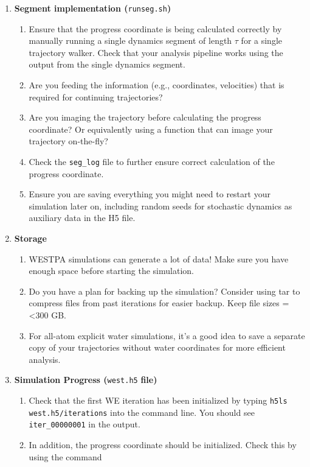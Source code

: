 \documentclass[9pt,tutorial,pubversion]{livecoms}
\begin{document}
\begin{enumerate}
\begin{enumerate}
\end{enumerate}
\item \textbf{Segment implementation (}\verb|runseg.sh|\textbf{)}
\begin{enumerate}
\item Ensure that the progress coordinate is being calculated correctly by manually running a single dynamics segment of length $\tau$ for a single trajectory walker. 
Check that your analysis pipeline works using the output from the single dynamics segment. 
\item Are you feeding the information (e.g., coordinates, velocities) that is required for continuing trajectories? 
\item Are you imaging the trajectory before calculating the progress coordinate?  Or equivalently using a function that can image your trajectory on-the-fly?
\item Check the \verb|seg_log| file to further ensure correct calculation of the progress coordinate. 
\item Ensure you are saving everything you might need to restart your simulation later on, including random seeds for stochastic dynamics as auxiliary data in the H5 file. 
\end{enumerate}
\item \textbf{Storage}
\begin{enumerate}
\item WESTPA simulations can generate a lot of data! Make sure you have enough space before starting the simulation.
\item Do you have a plan for backing up the simulation? 
Consider using tar to compress files from past iterations for easier backup. 
Keep file sizes =<300 GB. 
\item For all-atom explicit water simulations, it's a good idea to save a separate copy of your trajectories without water coordinates for more efficient analysis.
\end{enumerate}
\item \textbf{Simulation Progress (}\verb|west.h5| \textbf{file)}
\begin{enumerate}
\item Check that the first WE iteration has been initialized by typing \verb|h5ls west.h5/iterations| into the command line.  
You should see \verb|iter_00000001| in the output.
\item In addition, the progress coordinate should be initialized.
Check this by using the command 


\end{enumerate}
\end{enumerate}
\end{document}

